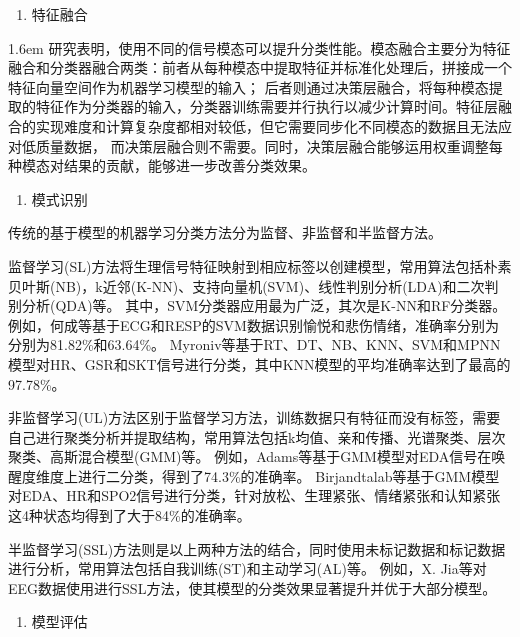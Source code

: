 \begin{enumerate}[\qquad(3)]
    \item 特征融合
\end{enumerate}

\hangindent 1.6em
研究表明，使用不同的信号模态可以提升分类性能\cite{DEAP2011}。模态融合主要分为特征融合和分类器融合两类：前者从每种模态中提取特征并标准化处理后，拼接成一个特征向量空间作为机器学习模型的输入；
后者则通过决策层融合，将每种模态提取的特征作为分类器的输入，分类器训练需要并行执行以减少计算时间。特征层融合的实现难度和计算复杂度都相对较低，但它需要同步化不同模态的数据且无法应对低质量数据，
而决策层融合则不需要。同时，决策层融合能够运用权重调整每种模态对结果的贡献\cite{DEAP2011}，能够进一步改善分类效果。


\begin{enumerate}[\hspace{1.2em}3.]    
    \item 模式识别
\end{enumerate}

传统的基于模型的机器学习分类方法分为监督、非监督和半监督方法。

监督学习(SL)方法将生理信号特征映射到相应标签以创建模型，常用算法包括朴素贝叶斯(NB)，k近邻(K-NN)、支持向量机(SVM)、线性判别分析(LDA)和二次判别分析(QDA)等。
其中，SVM分类器应用最为广泛，其次是K-NN和RF分类器。例如，何成等\cite{HeCheng2017}基于ECG和RESP的SVM数据识别愉悦和悲伤情绪，准确率分别为分别为81.82\%和63.64\%。
Myroniv等\cite{Myroniv2017}基于RT、DT、NB、KNN、SVM和MPNN模型对HR、GSR和SKT信号进行分类，其中KNN模型的平均准确率达到了最高的97.78\%。

非监督学习(UL)方法区别于监督学习方法，训练数据只有特征而没有标签，需要自己进行聚类分析并提取结构，常用算法包括k均值、亲和传播、光谱聚类、层次聚类、高斯混合模型(GMM)等。
例如，Adams等\cite{Adams2014}基于GMM模型对EDA信号在唤醒度维度上进行二分类，得到了74.3\%的准确率。
Birjandtalab等\cite{Birjandtalab2016}基于GMM模型对EDA、HR和SPO2信号进行分类，针对放松、生理紧张、情绪紧张和认知紧张这4种状态均得到了大于84\%的准确率。

\raggedbottom
半监督学习(SSL)方法则是以上两种方法的结合，同时使用未标记数据和标记数据进行分析，常用算法包括自我训练(ST)和主动学习(AL)等。
例如，X. Jia等\cite{JiaXiaowei2015}对EEG数据使用进行SSL方法，使其模型的分类效果显著提升并优于大部分模型。

\begin{enumerate}[\hspace{1.2em}4.]    
    \item 模型评估
\end{enumerate}

